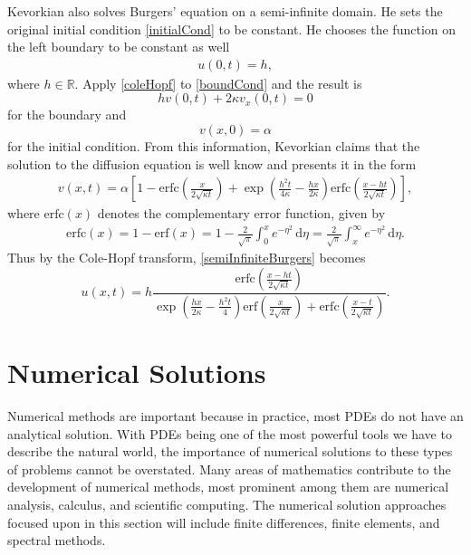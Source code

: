 \documentclass[undefended]{sfuthesis}
\begin{document}
Kevorkian \cite{solution} also solves Burgers' equation on a semi-infinite domain. He sets the original initial condition \eqref{initialCond} to be constant. He chooses the function on the left boundary to be constant as well
\begin{align}
u(0, t) = h, \label{boundCond}
\end{align}
where $h \in \mathbb{R}$. Apply \eqref{coleHopf} to \eqref{boundCond} and the result is \[h v(0, t) + 2 \kappa v_x(0,t) = 0\] for the boundary and \[v(x, 0) = \alpha \] for the initial condition. From this information, Kevorkian claims that the solution to the diffusion equation is well know and presents it in the form
\begin{align}
v(x, t) = \alpha \left[1 - \mathrm{erfc}\left(\frac{x}{2 \sqrt{\kappa t}}\right) + \exp\left(\frac{h^2 t}{4 \kappa} - \frac{hx}{2 \kappa}\right)\mathrm{erfc}\left(\frac{x - ht}{2 \sqrt{\kappa t}}\right)\right], \label{semiInfiniteBurgers}
\end{align} 
where $\mathrm{erfc}(x)$ denotes the complementary error function, given by
\begin{align*}
\mathrm{erfc}(x) = 1 - \mathrm{erf}(x) = 1 - \frac{2}{\sqrt{\pi}} \int_{0}^{x} e^{-\eta^2} \,\mathrm{d} \eta = \frac{2}{\sqrt{\pi}} \int_{x}^{\infty} e^{-\eta^2} \,\mathrm{d} \eta.
\end{align*}
Thus by the Cole-Hopf transform, \eqref{semiInfiniteBurgers} becomes \[u(x, t) = h \frac{\mathrm{erfc}\left(\frac{x - ht}{2 \sqrt{\kappa t}}\right)}{\exp\left(\frac{hx}{2 \kappa} - \frac{h^2 t}{4}\right)\mathrm{erf}\left(\frac{x}{2 \sqrt{\kappa t}}\right) + \mathrm{erfc}\left(\frac{x - t}{2 \sqrt{\kappa t}}\right)}.\]

\chapter{Numerical Solutions}
\label{sec:numericalSolutions}

Numerical methods are important because in practice, most PDEs do not have an analytical solution. With PDEs being one of the most powerful tools we have to describe the natural world, the importance of numerical solutions to these types of problems cannot be overstated. Many areas of mathematics contribute to the development of numerical methods, most prominent among them are numerical analysis, calculus, and scientific computing. The numerical solution approaches focused upon in this section will include finite differences, finite elements, and spectral methods. %
\end{document}
